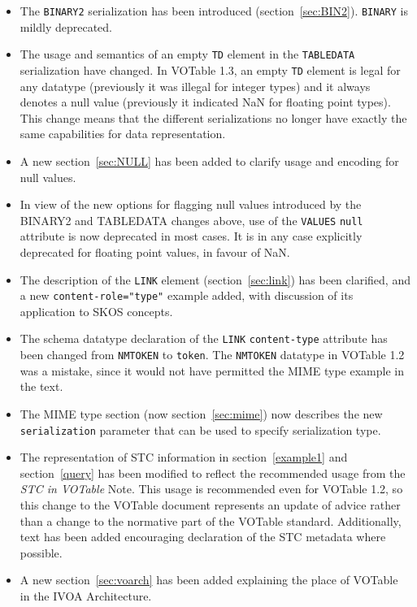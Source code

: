 \documentclass[11pt,a4paper]{ivoa}
\def\Aref#1{section~\ref{#1}}
\let\fg=\color
\def\attr#1{{\tt{\fg{DarkRed}#1}}}
\def\elem#1{{\tt{\fg{DarkRed}#1}}}
\def\attrval#1#2{{\tt{\fg{DarkRed}#1}="{\fg{DarkPurple}#2}"}}
\begin{document}
{{{\begin{itemize}
\item The \elem{BINARY2} serialization has been introduced
      (\Aref{sec:BIN2}).
      \elem{BINARY} is mildly deprecated.
\item The usage and semantics of an empty \elem{TD} element in the
      \elem{TABLEDATA} serialization have changed.
      In VOTable 1.3, an empty \elem{TD} element is legal for any datatype
      (previously it was illegal for integer types)
      and it always denotes a null value
      (previously it indicated NaN for floating point types).
      This change means that the different serializations no longer have
      exactly the same capabilities for data representation.
\item A new \Aref{sec:NULL} has been added to clarify
      usage and encoding for null values.
\item In view of the new options for flagging null values introduced by the
      BINARY2 and TABLEDATA changes above, use of the
      \elem{VALUES} \attr{null} attribute is now deprecated in most cases.
      It is in any case explicitly deprecated for floating point values,
      in favour of NaN.
\item The description of the \elem{LINK} element (\Aref{sec:link})
      has been clarified, and a new \attrval{content-role}{type}
      example added, with discussion of its application to SKOS concepts.
\item The schema datatype declaration of the \elem{LINK} \attr{content-type}
      attribute has been changed from {\tt NMTOKEN} to {\tt token}.
      The {\tt NMTOKEN} datatype in VOTable 1.2 was a mistake, since it
      would not have permitted the MIME type example in the text.
\item The MIME type section (now \Aref{sec:mime}) now describes
      the new {\tt serialization} parameter that can be used to specify
      serialization type.
\item The representation of STC information in \Aref{example1}
      and \Aref{query}
      has been modified to reflect the recommended usage from the
      {\em STC in VOTable} Note.  This usage is recommended even for
      VOTable 1.2, so this change to the VOTable document represents
      an update of advice rather than a change to the normative part
      of the VOTable standard.  Additionally, text has been added
      encouraging declaration of the STC metadata where possible.
\item A new \Aref{sec:voarch} has been added explaining
      the place of VOTable in the IVOA Architecture.
\end{itemize}

}}}
\end{document}
